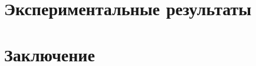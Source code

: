 \section{Экспериментальные результаты}











\unewpage
\section{Заключение}




\unewpage
{}




% 
